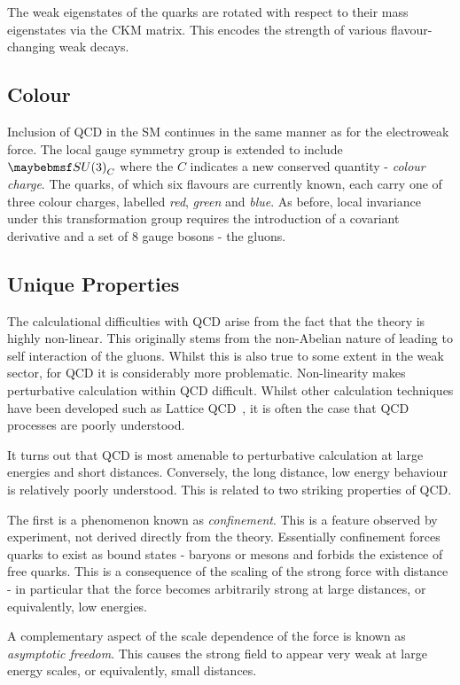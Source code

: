 The weak eigenstates of the quarks are rotated with respect to their mass
eigenstates via the \acl{CKM} matrix. This encodes the strength of various
flavour-changing weak decays.

\subsection{Colour}
Inclusion of \ac{QCD} in the \ac{SM} continues in the same manner as for the
electroweak force. The local gauge symmetry group is extended to include
$\SUthree_{C}$ where the $C$ indicates a new conserved quantity - \emph{colour
  charge}. The quarks, of which six flavours are currently known, each carry one
of three colour charges, labelled \emph{red}, \emph{green} and \emph{blue}. As
before, local invariance under this transformation group requires the
introduction of a covariant derivative and a set of 8 gauge bosons - the gluons.

\subsection{Unique Properties}
The calculational difficulties with \ac{QCD} arise from the fact that the theory
is highly non-linear. This originally stems from the non-Abelian nature of
\SUthree leading to self interaction of the gluons. Whilst this is also true to
some extent in the weak sector, for \ac{QCD} it is considerably more
problematic. Non-linearity makes perturbative calculation within \ac{QCD}
difficult. Whilst other calculation techniques have been developed such as
Lattice \ac{QCD}~\cite{lattice_qcd}, it is often the case that \ac{QCD}
processes are poorly understood.

It turns out that \ac{QCD} is most amenable to perturbative calculation at large
energies and short distances. Conversely, the long distance, low energy
behaviour is relatively poorly understood. This is related to two striking
properties of \ac{QCD}.

The first is a phenomenon known as \emph{confinement}. This is a feature
observed by experiment, not derived directly from the theory.  Essentially
confinement forces quarks to exist as bound states - baryons or mesons and
forbids the existence of free quarks.  This is a consequence of the scaling of
the strong force with distance - in particular that the force becomes
arbitrarily strong at large distances, or equivalently, low energies.

A complementary aspect of the scale dependence of the force is known as
\emph{asymptotic freedom}. This causes the strong field to appear very weak at
large energy scales, or equivalently, small distances.
